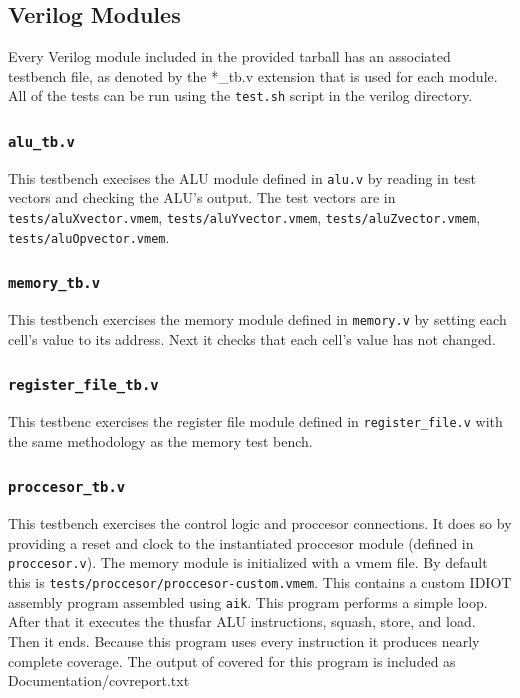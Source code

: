 \documentclass[conference]{IEEEtran}
\begin{document}
\subsection{Verilog Modules}
Every Verilog module included in the provided tarball has an associated
testbench file, as denoted by the *\_tb.v extension that is used for each
module. All of the tests can be run using the \texttt{test.sh} script in 
the verilog directory. 

\subsubsection{\texttt{alu\_tb.v}}
This testbench execises the ALU module defined in \texttt{alu.v} by reading
in test vectors and checking the ALU's output. The test vectors are in
\texttt{tests/aluXvector.vmem}, \texttt{tests/aluYvector.vmem},
\texttt{tests/aluZvector.vmem}, \texttt{tests/aluOpvector.vmem}. 

\subsubsection{\texttt{memory\_tb.v}}
This testbench exercises the memory module defined in \texttt{memory.v} by
setting each cell's value to its address. Next it checks that each cell's value
has not changed.

\subsubsection{\texttt{register\_file\_tb.v}}
This testbenc exercises the register file module defined in \texttt{register\_file.v} with the same methodology as the memory test bench.

\subsubsection{\texttt{proccesor\_tb.v}}
This testbench exercises the control logic and proccesor connections. It does
so by providing a reset and clock to the instantiated proccesor module (defined
in \texttt{proccesor.v}). The memory module is initialized with a vmem file. By
default this is 
\texttt{tests/proccesor/proccesor-custom.vmem}. This contains a custom IDIOT
assembly program assembled using \texttt{aik}. This program performs a simple
loop. After that it executes the thusfar ALU instructions, squash, store, and
load. Then it ends. Because this program uses every instruction it produces 
nearly complete coverage. The output of covered for this program is included
as Documentation/covreport.txt
\end{document}
